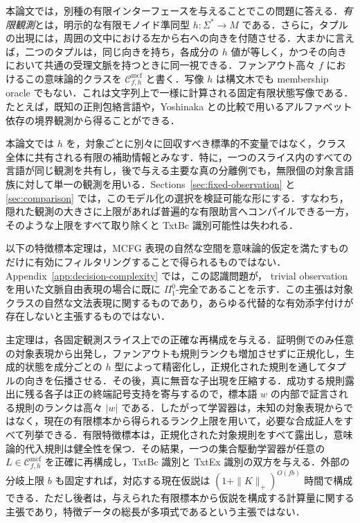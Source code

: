 \documentclass[11pt,a4paper]{ltjsarticle}
\numberwithin{equation}{section}
\theoremstyle{plain}
\theoremstyle{definition}
\theoremstyle{remark}
\newcommand{\Cmcf}[2]{\mathcal{C}^{\mathrm{mcf}}_{#1,#2}}
\begin{document}
本論文では，別種の有限インターフェースを与えることでこの問題に答える．\emph{有限観測}とは，明示的な有限モノイド準同型 $h:\Sigma^*\to M$ である．さらに，タプルの出現には，周囲の文中における左から右への向きを付随させる．大まかに言えば，二つのタプルは，同じ向きを持ち，各成分の $h$ 値が等しく，かつその向きにおいて共通の受理文脈を持つときに同一視できる．ファンアウト高々 $f$ におけるこの意味論的クラスを $\Cmcf{f}{h}$ と書く．写像 $h$ は構文木でも membership oracle でもない．これは文字列上で一様に計算される固定有限状態写像である．たとえば，既知の正則包絡言語や，Yoshinaka との比較で用いるアルファベット依存の境界観測から得ることができる．

本論文では $h$ を，対象ごとに別々に回収すべき標準的不変量ではなく，クラス全体に共有される有限の補助情報とみなす．特に，一つのスライス内のすべての言語が同じ観測を共有し，後で与える主要な真の分離例でも，無限個の対象言語族に対して単一の観測を用いる．Sections~\ref{sec:fixed-observation} と \ref{sec:comparison} では，このモデル化の選択を検証可能な形にする．すなわち，隠れた観測の大きさに上限があれば普遍的な有限助言へコンパイルできる一方，そのような上限をすべて取り除くと TxtBc 識別可能性は失われる．

以下の特徴標本定理は，MCFG 表現の自然な空間を意味論的仮定を満たすものだけに有効にフィルタリングすることで得られるものではない．Appendix~\ref{app:decision-complexity} では，この認識問題が， trivial observation を用いた文脈自由表現の場合に既に $\Pi^0_1$-完全であることを示す．この主張は対象クラスの自然な文法表現に関するものであり，あらゆる代替的な有効添字付けが存在しないと主張するものではない．

主定理は，各固定観測スライス上での正確な再構成を与える．証明側でのみ任意の対象表現から出発し，ファンアウトも規則ランクも増加させずに正規化し，生成的状態を成分ごとの $h$ 型によって精密化し，正規化された規則を通してタプルの向きを伝播させる．その後，真に無音な子出現を圧縮する．成功する規則露出に残る各子は正の終端記号支持を寄与するので，標本語 $w$ の内部で証言される規則のランクは高々 $|w|$ である．したがって学習器は，未知の対象表現からではなく，現在の有限標本から得られるランク上限を用いて，必要な合成証人をすべて列挙できる．有限特徴標本は，正規化された対象規則をすべて露出し，意味論的代入規則は健全性を保つ．その結果，一つの集合駆動学習器が任意の $L\in\Cmcf{f}{h}$ を正確に再構成し，TxtBc 識別と TxtEx 識別の双方を与える．外部の分岐上限 $b$ も固定すれば，対応する現在仮説は $(1+\|K\|_+)^{O(fb)}$ 時間で構成できる．ただし後者は，与えられた有限標本から仮説を構成する計算量に関する主張であり，特徴データの総長が多項式であるという主張ではない．
\end{document}
